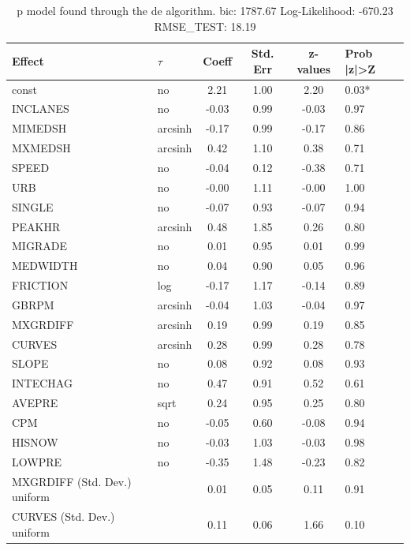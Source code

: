 \begin{table}
	\caption{p model found through the de algorithm. bic: 1787.67 Log-Likelihood: -670.23 RMSE_TEST: 18.19}
	\begin{center}
		\begin{tabular}{|l|l|c|c|c|l|}
			\hline
			Effect & $\tau$ & Coeff & Std. Err & z-values & Prob |z|>Z \\
			\hline
			const & no & 2.21 & 1.00 & 2.20 & 0.03* \\
			\hline
			INCLANES & no & -0.03 & 0.99 & -0.03 & 0.97 \\
			\hline
			MIMEDSH & arcsinh & -0.17 & 0.99 & -0.17 & 0.86 \\
			\hline
			MXMEDSH & arcsinh & 0.42 & 1.10 & 0.38 & 0.71 \\
			\hline
			SPEED & no & -0.04 & 0.12 & -0.38 & 0.71 \\
			\hline
			URB & no & -0.00 & 1.11 & -0.00 & 1.00 \\
			\hline
			SINGLE & no & -0.07 & 0.93 & -0.07 & 0.94 \\
			\hline
			PEAKHR & arcsinh & 0.48 & 1.85 & 0.26 & 0.80 \\
			\hline
			MIGRADE & no & 0.01 & 0.95 & 0.01 & 0.99 \\
			\hline
			MEDWIDTH & no & 0.04 & 0.90 & 0.05 & 0.96 \\
			\hline
			FRICTION & log & -0.17 & 1.17 & -0.14 & 0.89 \\
			\hline
			GBRPM & arcsinh & -0.04 & 1.03 & -0.04 & 0.97 \\
			\hline
			MXGRDIFF & arcsinh & 0.19 & 0.99 & 0.19 & 0.85 \\
			\hline
			CURVES & arcsinh & 0.28 & 0.99 & 0.28 & 0.78 \\
			\hline
			SLOPE & no & 0.08 & 0.92 & 0.08 & 0.93 \\
			\hline
			INTECHAG & no & 0.47 & 0.91 & 0.52 & 0.61 \\
			\hline
			AVEPRE & sqrt & 0.24 & 0.95 & 0.25 & 0.80 \\
			\hline
			CPM & no & -0.05 & 0.60 & -0.08 & 0.94 \\
			\hline
			HISNOW & no & -0.03 & 1.03 & -0.03 & 0.98 \\
			\hline
			LOWPRE & no & -0.35 & 1.48 & -0.23 & 0.82 \\
			\hline
			MXGRDIFF (Std. Dev.) uniform &  & 0.01 & 0.05 & 0.11 & 0.91 \\
			\hline
			CURVES (Std. Dev.) uniform &  & 0.11 & 0.06 & 1.66 & 0.10 \\

\end{tabular}
\end{center}
\end{table}
